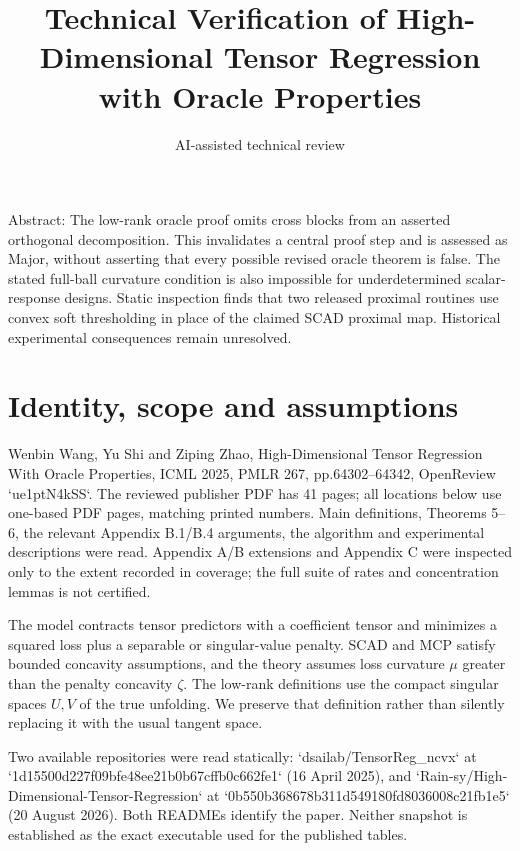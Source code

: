 \documentclass[10pt]{article}
\title{Technical Verification of
High-Dimensional Tensor Regression with Oracle Properties}
\author{AI-assisted technical review}
\date{}
\begin{document}
\maketitle
Abstract: The low-rank oracle proof omits cross blocks from an asserted orthogonal decomposition. This invalidates a central proof step and is assessed as Major, without asserting that every possible revised oracle theorem is false. The stated full-ball curvature condition is also impossible for underdetermined scalar-response designs. Static inspection finds that two released proximal routines use convex soft thresholding in place of the claimed SCAD proximal map. Historical experimental consequences remain unresolved.\par
\section*{Identity, scope and assumptions}
Wenbin Wang, Yu Shi and Ziping Zhao, High-Dimensional Tensor Regression With Oracle Properties, ICML 2025, PMLR 267, pp.64302–64342, OpenReview `ue1ptN4kSS`. The reviewed publisher PDF has 41 pages; all locations below use one-based PDF pages, matching printed numbers. Main definitions, Theorems 5–6, the relevant Appendix B.1/B.4 arguments, the algorithm and experimental descriptions were read. Appendix A/B extensions and Appendix C were inspected only to the extent recorded in coverage; the full suite of rates and concentration lemmas is not certified.\par
The model contracts tensor predictors with a coefficient tensor and minimizes a squared loss plus a separable or singular-value penalty. SCAD and MCP satisfy bounded concavity assumptions, and the theory assumes loss curvature \(\mu\) greater than the penalty concavity \(\zeta\). The low-rank definitions use the compact singular spaces \(U,V\) of the true unfolding. We preserve that definition rather than silently replacing it with the usual tangent space.\par
Two available repositories were read statically: `dsailab/TensorReg\_ncvx` at `1d15500d227f09bfe48ee21b0b67cffb0c662fe1` (16 April 2025), and `Rain-sy/High-Dimensional-Tensor-Regression` at `0b550b368678b311d549180fd8036008c21fb1e5` (20 August 2026). Both READMEs identify the paper. Neither snapshot is established as the exact executable used for the published tables.\par
\end{document}
